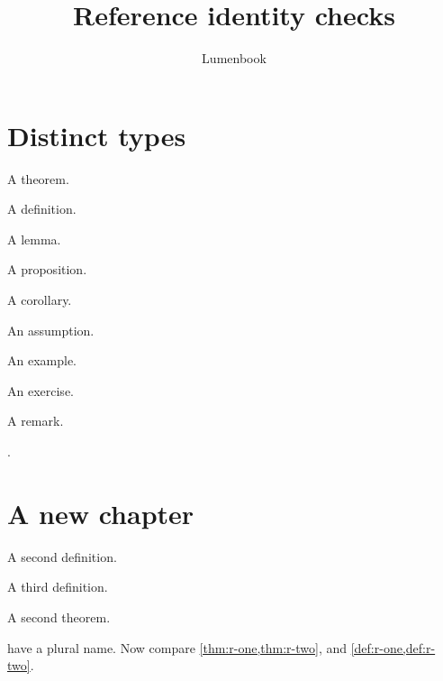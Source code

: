 \documentclass[print,boxes=false]{lumenbook}
\title{Reference identity checks}
\author{Lumenbook}
\begin{document}
\chapter{Distinct types}
\begin{theorem}\label{thm:r-one}A theorem.\end{theorem}
\begin{definition}\label{def:r-one}A definition.\end{definition}
\begin{lemma}\label{lem:r-one}A lemma.\end{lemma}
\begin{proposition}\label{prop:r-one}A proposition.\end{proposition}
\begin{corollary}\label{cor:r-one}A corollary.\end{corollary}
\begin{assumption}\label{ass:r-one}An assumption.\end{assumption}
\begin{example}\label{eg:r-one}An example.\end{example}
\begin{exercise}\label{ex:r-one}An exercise.\end{exercise}
\begin{remark}\label{rem:r-one}A remark.\end{remark}
.
\chapter{A new chapter}
\begin{definition}\label{def:r-two}A second definition.\end{definition}
\begin{definition}\label{def:r-three}A third definition.\end{definition}
\begin{theorem}\label{thm:r-two}A second theorem.\end{theorem}
 have a plural name.
Now compare \cref{thm:r-one,thm:r-two}, and \cref{def:r-one,def:r-two}.
\end{document}
